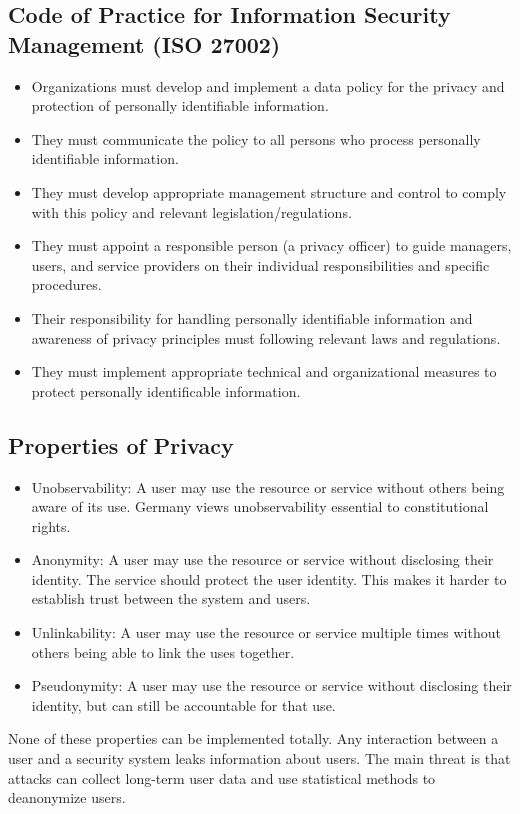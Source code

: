 \documentclass{math}
\begin{document}
\subsection*{Code of Practice for Information Security Management (ISO 27002)}
\begin{itemize}
  \item Organizations must develop and implement a data policy for the privacy
  and protection of personally identifiable information.
  \item They must communicate the policy to all persons who process personally
  identifiable information.
  \item They must develop appropriate management structure and control to comply
  with this policy and relevant legislation/regulations.
  \item They must appoint a responsible person (a privacy officer) to guide
  managers, users, and service providers on their individual responsibilities
  and specific procedures.
  \item Their responsibility for handling personally identifiable information
  and awareness of privacy principles must following relevant laws and
  regulations.
  \item They must implement appropriate technical and organizational measures to
  protect personally identificable information.
\end{itemize}

\subsection*{Properties of Privacy}
\begin{itemize}
  \item Unobservability: A user may use the resource or service without others
  being aware of its use. Germany views unobservability essential to
  constitutional rights.
  \item Anonymity: A user may use the resource or service without disclosing
  their identity. The service should protect the user identity. This makes
  it harder to establish trust between the system and users.
  \item Unlinkability: A user may use the resource or service multiple times
  without others being able to link the uses together.
  \item Pseudonymity: A user may use the resource or service without disclosing
  their identity, but can still be accountable for that use.
\end{itemize}
None of these properties can be implemented totally. Any interaction between a
user and a security system leaks information about users. The main threat is
that attacks can collect long-term user data and use statistical methods to
deanonymize users.
\end{document}
